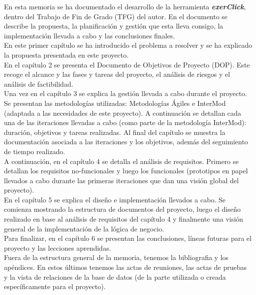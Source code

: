 En esta memoria se ha documentado  el desarrollo de la herramienta \textbf{\textit{exerClick}}, dentro del Trabajo de Fin de Grado (TFG) del autor. En el documento se describe la propuesta, la planificación y gestión que esta lleva consigo, la implementación llevada a cabo y las conclusiones finales.\\

En este primer capítulo se ha introducido el problema a resolver y se ha explicado la propuesta presentada en este proyecto.\\

En el capítulo 2 se presenta el Documento de Objetivos de Proyecto (DOP). Este recoge el alcance y las fases y tareas del proyecto, el análisis de riesgos y el análisis de factibilidad.\\

Una vez en el capítulo 3 se explica la gestión llevada a cabo durante el proyecto. Se presentan las metodologías utilizadas: Metodologías Ágiles e InterMod (adaptada a las necesidades de este proyecto). A continuación se detallan cada una de las iteraciones llevadas a cabo (como parte de la metodología InterMod): duración, objetivos y tareas realizadas. Al final del capítulo se muestra la documentación asociada a las iteraciones y los objetivos, además del seguimiento de tiempo realizado.\\

A continuación, en el capítulo 4 se detalla el análisis de requisitos. Primero se detallan los requisitos no-funcionales y luego los funcionales (prototipos en papel llevados a cabo durante las primeras iteraciones que dan una visión global del proyecto).\\

En el capítulo 5 se explica el diseño e implementación llevados a cabo. Se comienza mostrando la estructura de documentos del proyecto, luego el diseño realizado en base al análisis de requisitos del capítulo 4 y finalmente una visión general de la implementación de la lógica de negocio.\\

Para finalizar, en el capítulo 6 se presentan las conclusiones, líneas futuras para el proyecto y las lecciones aprendidas.\\

Fuera de la estructura general de la memoria, tenemos la bibliografia y los apéndices. En estos últimos tenemos las actas de reuniones, las actas de pruebas y la vista de relaciones de la base de datos (de la parte utilizada o creada específicamente para el proyecto).\\